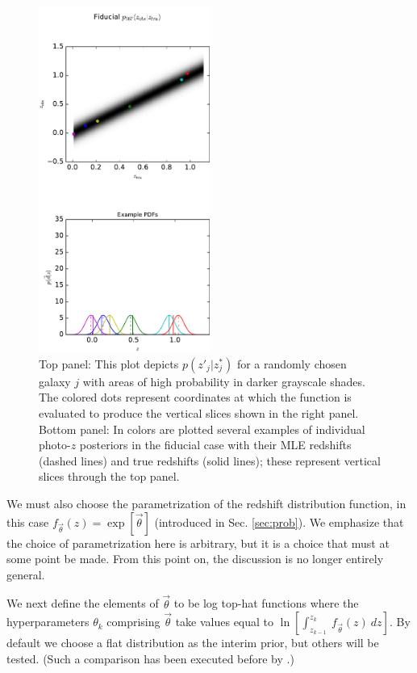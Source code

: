 \documentclass[preprint]{aastex}
\begin{document}
\begin{figure}
\includegraphics[width=0.5\textwidth]{figs/sig2/zobsvztru.pdf}
\caption{Top panel: This plot depicts $p(z'_{j}|z^{*}_{j})$ for a randomly 
chosen galaxy $j$ with areas of high probability in darker grayscale shades.  
The colored dots represent coordinates at which the function is evaluated to 
produce the vertical slices shown in the right panel.  Bottom panel: In colors 
are plotted several examples of individual photo-$z$ posteriors in the fiducial 
case with their MLE redshifts (dashed lines) and true redshifts (solid lines); 
these represent vertical slices through the top panel.}
\label{fig:nullpzs}
\end{figure}

We must also choose the parametrization of the redshift distribution function, 
in this case $f_{\vec{\theta}}(z)=\exp[\vec{\theta}]$ (introduced in Sec. 
\ref{sec:prob}).   We emphasize that the choice of parametrization here is 
arbitrary, but it is a choice that must at some point be made.  From this point 
on, the discussion is no longer entirely general.  

We next define the elements of $\vec{\theta}$ to be log top-hat functions where 
the hyperparameters $\theta_{k}$ comprising $\vec{\theta}$ take values equal to 
$\ln[\int_{z_{k-1}}^{z_{k}}\ f_{\vec{\theta}}(z)\ dz]$.  By default we choose a 
flat distribution as the interim prior, but others will be tested.  (Such a 
comparison has been executed before by \citet{Viironen2015}.)
\end{document}
